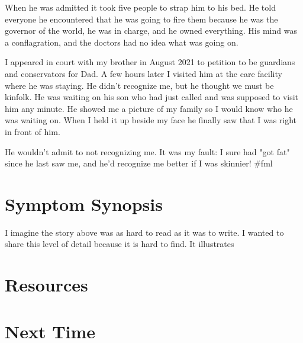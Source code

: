 \documentclass{article}
\begin{document}
When he was admitted it took five people to strap him to his bed. He told everyone he encountered that he was going to fire them because he was the governor of the world, he was in charge, and he owned everything. His mind was a conflagration, and the doctors had no idea what was going on.

I appeared in court with my brother in August 2021 to petition to be guardians and conservators for Dad. A few hours later I visited him at the care facility where he was staying. He didn't recognize me, but he thought we must be kinfolk. He was waiting on his son who had just called and was supposed to visit him any minute. He showed me a picture of my family so I would know who he was waiting on. When I held it up beside my face he finally saw that I was right in front of him. 

He wouldn't admit to not recognizing me. It was my fault: I sure had "got fat" since he last saw me, and he'd recognize me better if I was skinnier! \#fml

\section*{Symptom Synopsis}

I imagine the story above was as hard to read as it was to write. I wanted to share this level of detail because it is hard to find. It illustrates

\section*{Resources}

\section*{Next Time}




\end{document}
